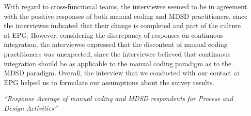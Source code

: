 \documentclass[final_report_innit.tex]{subfiles}
\begin{document}
With regard to cross-functional teams, the interviewee seemed to be in agreement with the positive responses of both manual coding and MDSD practitioners, since the interviewee indicated that their change is completed and part of the culture at EPG. However, considering the discrepancy of responses on continuous integration, the interviewee expressed that the discontent of manual coding practitioners was unexpected, since the interviewee believed that continuous integration should be as applicable to the manual coding paradigm as to the MDSD paradigm. Overall, the interview that we conducted with our contact at EPG helped us to formulate our assumptions about the survey results. 
\\

\textit{``Response Average of manual coding and MDSD respondents for Process and Design Activities''}
\end{document}
